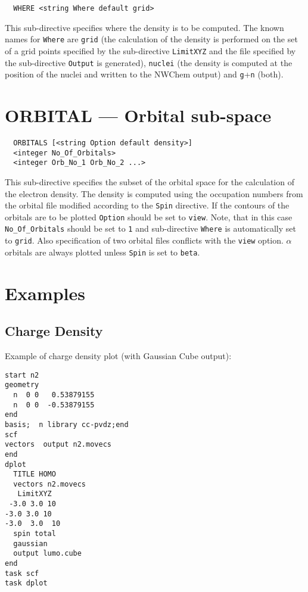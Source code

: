 \begin{verbatim}
  WHERE <string Where default grid>
\end{verbatim}

This sub-directive specifies where the density is to be computed.
The known names for \verb+Where+ are \verb+grid+ (the calculation of
the density is performed on the set of a grid points specified by the
sub-directive \verb+LimitXYZ+ and the file specified by the sub-directive
\verb+Output+ is generated), \verb+nuclei+ (the density is computed at
the position of the nuclei and written to the NWChem output) and
\verb+g++\verb+n+ (both).


\section{ORBITAL --- Orbital sub-space}

\begin{verbatim}
  ORBITALS [<string Option default density>]
  <integer No_Of_Orbitals>
  <integer Orb_No_1 Orb_No_2 ...>
\end{verbatim}

This sub-directive specifies the subset of the orbital space for the
calculation of the electron density. The density is computed using the
occupation numbers from the orbital file modified according to the
\verb+Spin+ directive. If the contours of the orbitals are to be plotted
\verb+Option+ should be set to \verb+view+. Note, that in this case
\verb+No_Of_Orbitals+ should be set to \verb+1+ and sub-directive
\verb+Where+ is automatically set to \verb+grid+. Also specification
of two orbital files conflicts with the \verb+view+ option.
$\alpha$ orbitals are always plotted unless \verb+Spin+ is set to
\verb+beta+.

\section{Examples}

\subsection*{Charge Density}

Example of charge density plot (with Gaussian Cube output):
\begin{verbatim}
start n2
geometry
  n  0 0   0.53879155
  n  0 0  -0.53879155
end
basis;  n library cc-pvdz;end
scf
vectors  output n2.movecs
end
dplot
  TITLE HOMO
  vectors n2.movecs
   LimitXYZ
 -3.0 3.0 10  
-3.0 3.0 10 
-3.0  3.0  10
  spin total
  gaussian
  output lumo.cube
end
task scf     
task dplot
\end{verbatim}

